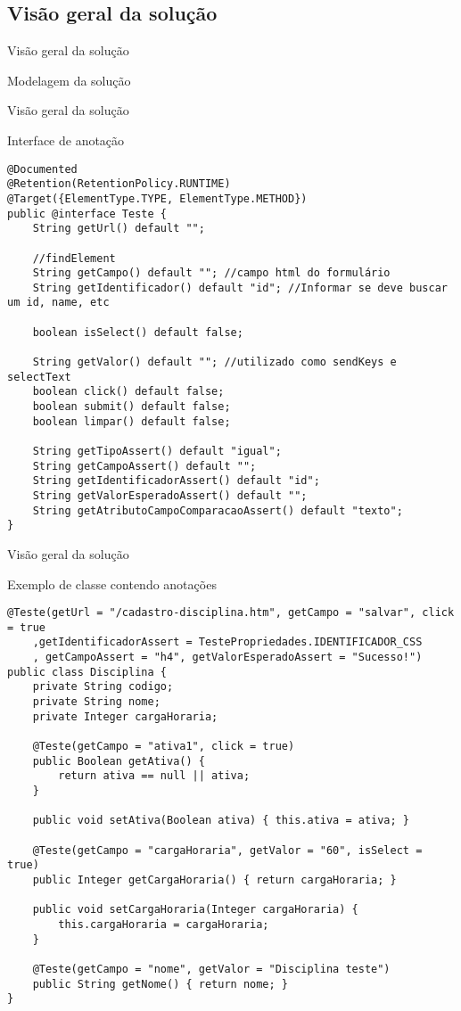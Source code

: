 \documentclass{beamer}
\begin{document}
\subsection{Visão geral da solução}
\begin{frame}{Visão geral da solução}
    \item Modelagem da solução
	\begin{center}\end{center}
\end{frame}
\begin{frame}[fragile]{Visão geral da solução}
    \item Interface de anotação
    \begin{lstlisting}
@Documented
@Retention(RetentionPolicy.RUNTIME)
@Target({ElementType.TYPE, ElementType.METHOD})
public @interface Teste {
    String getUrl() default "";

    //findElement
    String getCampo() default ""; //campo html do formulário
    String getIdentificador() default "id"; //Informar se deve buscar um id, name, etc

    boolean isSelect() default false;

    String getValor() default ""; //utilizado como sendKeys e selectText
    boolean click() default false;
    boolean submit() default false;
    boolean limpar() default false;

    String getTipoAssert() default "igual";
    String getCampoAssert() default "";
    String getIdentificadorAssert() default "id";
    String getValorEsperadoAssert() default "";
    String getAtributoCampoComparacaoAssert() default "texto";
}
	\end{lstlisting}
\end{frame}
\begin{frame}[fragile]{Visão geral da solução}
    \item Exemplo de classe contendo anotações
    \begin{lstlisting}
@Teste(getUrl = "/cadastro-disciplina.htm", getCampo = "salvar", click = true
    ,getIdentificadorAssert = TestePropriedades.IDENTIFICADOR_CSS
    , getCampoAssert = "h4", getValorEsperadoAssert = "Sucesso!")
public class Disciplina {
    private String codigo;
    private String nome;
    private Integer cargaHoraria;

    @Teste(getCampo = "ativa1", click = true)
    public Boolean getAtiva() {
        return ativa == null || ativa;
    }

    public void setAtiva(Boolean ativa) { this.ativa = ativa; }

    @Teste(getCampo = "cargaHoraria", getValor = "60", isSelect = true)
    public Integer getCargaHoraria() { return cargaHoraria; }

    public void setCargaHoraria(Integer cargaHoraria) { 
        this.cargaHoraria = cargaHoraria; 
    }

    @Teste(getCampo = "nome", getValor = "Disciplina teste")
    public String getNome() { return nome; }
}
	\end{lstlisting}
\end{frame}
\end{document}
